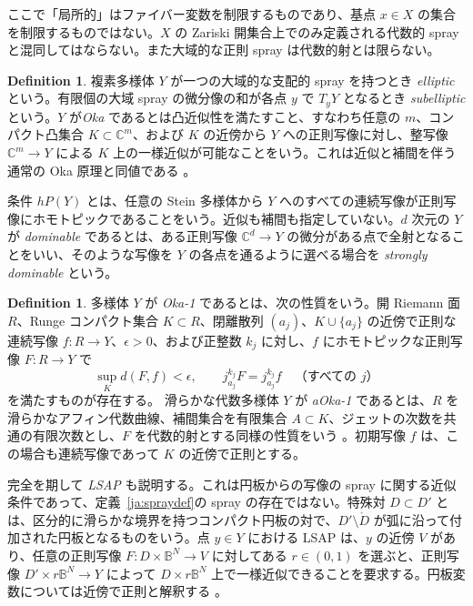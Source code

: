 \documentclass[12pt]{amsart}
\theoremstyle{definition}
\newtheorem{defn}[thm]{Definition}
\theoremstyle{remark}
\numberwithin{equation}{section}
\newcommand{\C}{\mathbb{C}}
\begin{document}
ここで「局所的」はファイバー変数を制限するものであり、基点 $x\in X$ の集合を制限するものではない。$X$ の Zariski 開集合上でのみ定義される代数的 spray と混同してはならない。また大域的な正則 spray は代数的射とは限らない。

\begin{defn}
複素多様体 $Y$ が一つの大域的な支配的 spray を持つとき \emph{elliptic} という。有限個の大域 spray の微分像の和が各点 $y$ で $T_yY$ となるとき \emph{subelliptic} という。$Y$ が\emph{Oka} であるとは凸近似性を満たすこと、すなわち任意の $m$、コンパクト凸集合 $K\subset\C^m$、および $K$ の近傍から $Y$ への正則写像に対し、整写像 $\C^m\to Y$ による $K$ 上の一様近似が可能なことをいう。これは近似と補間を伴う通常の Oka 原理と同値である \cite{ja:Book}。

条件 $hP(Y)$ とは、任意の Stein 多様体から $Y$ へのすべての連続写像が正則写像にホモトピックであることをいう。近似も補間も指定していない。$d$ 次元の $Y$ が \emph{dominable} であるとは、ある正則写像 $\C^d\to Y$ の微分がある点で全射となることをいい、そのような写像を $Y$ の各点を通るように選べる場合を \emph{strongly dominable} という。
\end{defn}

\begin{defn}\label{ja:okaone}
多様体 $Y$ が \emph{Oka-1} であるとは、次の性質をいう。開 Riemann 面 $R$、Runge コンパクト集合 $K\subset R$、閉離散列 $(a_j)$、$K\cup\{a_j\}$ の近傍で正則な連続写像 $f:R\to Y$、$\epsilon>0$、および正整数 $k_j$ に対し、$f$ にホモトピックな正則写像 $F:R\to Y$ で
\[
\sup_K d(F,f)<\epsilon,\qquad j^{k_j}_{a_j}F=j^{k_j}_{a_j}f\quad\text{（すべての }j\text{）}
\]
を満たすものが存在する。
滑らかな代数多様体 $Y$ が \emph{aOka-1} であるとは、$R$ を滑らかなアフィン代数曲線、補間集合を有限集合 $A\subset K$、ジェットの次数を共通の有限次数とし、$F$ を代数的射とする同様の性質をいう \cite{ja:AF,ja:FLone}。初期写像 $f$ は、この場合も連続写像であって $K$ の近傍で正則とする。
\end{defn}

完全を期して \emph{LSAP} も説明する。これは円板からの写像の spray に関する近似条件であって、定義~\ref{ja:spraydef}の spray の存在ではない。特殊対 $D\subset D'$ とは、区分的に滑らかな境界を持つコンパクト円板の対で、$D'\setminus\mathring D$ が弧に沿って付加された円板となるものをいう。点 $y\in Y$ における LSAP は、$y$ の近傍 $V$ があり、任意の正則写像 $F:D\times\mathbb B^N\to V$ に対してある $r\in(0,1)$ を選ぶと、正則写像 $D'\times r\mathbb B^N\to Y$ によって $D\times r\mathbb B^N$ 上で一様近似できることを要求する。円板変数については近傍で正則と解釈する \cite[Definitions~5.1--5.2]{ja:FLone}。
\end{document}
